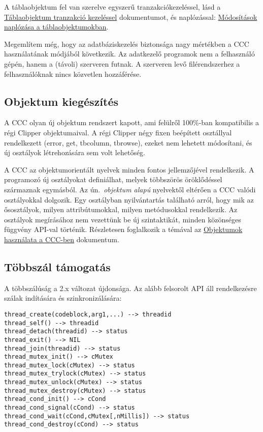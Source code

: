 A táblaobjektum fel van szerelve  egyszerű tranzakciókezeléssel, lásd a 
\href{transact.html}{Táb\-la\-ob\-jek\-tum tranzakció kezeléssel} 
dokumentumot, és naplózással: 
\href{tabnaplo.html}{Mó\-do\-sítá\-sok naplózása a táblaobjektumokban}.

Megemlítem még, hogy az adatbáziskezelés biztonsága nagy mértékben
a CCC használatának módjából következik. Az adatkezelő programok
nem a felhasználó gépén, hanem a (távoli) szerveren futnak. A szerveren
levő filérendszerhez a felhasználóknak nincs közvetlen hozzáférése. 
   

\subsection{Objektum kiegészítés}

A CCC olyan új objektum rendszert kapott, ami felülről 
100\%-ban kompatibilis a régi Clipper objektumaival. 
A régi Clipper négy fixen beépített osztállyal rendelkezett 
(error, get, tbcolumn, tbrowse), ezeket nem lehetett módosítani, 
és új osztályok létrehozására sem volt lehetőség. 

A CCC az objektumorientált nyelvek minden fontos jellemzőjével 
rendelkezik. A programozó új osztályokat definiálhat, melyek 
többszörös öröklődéssel származnak egymásból. 
Az ún.\ {\em objektum alapú\/} nyelvektől eltérően a CCC valódi 
osztályokkal dolgozik. Egy osztályban nyilvántartás található arról, 
hogy mik az ősosztályok,
milyen attribútumokkal,
milyen metódusokkal rendelkezik. 
Az osztályok megírásához nem vezettünk be új szintaktikát, 
minden közönséges függvény API-val történik. 
Részletesen foglalkozik a témával az
\href{objektum.html}{Objektumok használata a CCC-ben}
dokumentum.


\subsection{Többszál támogatás}

A többszálúság a 2.x változat újdonsága.
Az alább felsorolt API áll rendelkezésre
szálak indítására és szinkronizálására:

\begin{verbatim}
thread_create(codeblock,arg1,...) --> threadid
thread_self() --> threadid 
thread_detach(threadid) --> status
thread_exit() --> NIL
thread_join(threadid) --> status
thread_mutex_init() --> cMutex
thread_mutex_lock(cMutex) --> status
thread_mutex_trylock(cMutex) --> status 
thread_mutex_unlock(cMutex) --> status 
thread_mutex_destroy(cMutex) --> status 
thread_cond_init() --> cCond
thread_cond_signal(cCond) --> status
thread_cond_wait(cCond,cMutex[,nMillis]) --> status 
thread_cond_destroy(cCond) --> status
\end{verbatim}

